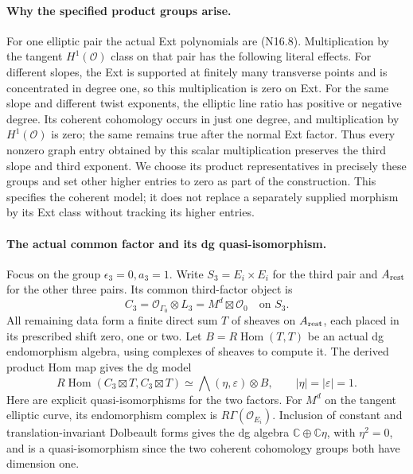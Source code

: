 \paragraph{Why the specified product groups arise.}
For one elliptic pair the actual Ext polynomials are (N16.8).
Multiplication by the tangent \(H^1(\mathcal O)\) class on that
pair has the following literal effects. For different slopes,
the Ext is supported at finitely many transverse points and is
concentrated in degree one, so this multiplication is zero on Ext.
For the same slope and different twist exponents, the elliptic
line ratio has positive or negative degree. Its coherent cohomology
occurs in just one degree, and multiplication by \(H^1(\mathcal O)\)
is zero; the same remains true after the normal Ext factor.
Thus every nonzero graph entry obtained by this scalar multiplication
preserves the third slope and third exponent. We choose its product
representatives in precisely these groups and set other higher
entries to zero as part of the construction. This specifies the
coherent model; it does not replace a separately supplied morphism
by its Ext class without tracking its higher entries.

\paragraph{The actual common factor and its dg quasi-isomorphism.}
Focus on the group \(\epsilon_3=0,a_3=1\). Write
\(S_3=E_i\times E_i\) for the third pair and \(A_{\rm rest}\)
for the other three pairs. Its common third-factor object is
\[
 C_3=\mathcal O_{\Gamma_0}\otimes L_3
       =M^d\boxtimes\mathcal O_0\quad\text{on }S_3.
\]
All remaining data form a finite direct sum \(T\) of sheaves on
\(A_{\rm rest}\), each placed in its prescribed shift zero, one
or two. Let \(B=R\operatorname{Hom}(T,T)\) be an actual dg
endomorphism algebra, using complexes of sheaves to compute it.
The derived product Hom map gives the dg model
\begin{equation}\label{eq:G24-product-model}
 R\operatorname{Hom}(C_3\boxtimes T,C_3\boxtimes T)
             \simeq\bigwedge(\eta,\varepsilon)\otimes B,
 \qquad |\eta|=|\varepsilon|=1.
\end{equation}
Here are explicit quasi-isomorphisms for the two factors. For
\(M^d\) on the tangent elliptic curve, its endomorphism complex
is \(R\Gamma(\mathcal O_{E_i})\). Inclusion of constant and
translation-invariant Dolbeault forms gives the dg algebra
\(\mathbb C\oplus\mathbb C\eta\), with \(\eta^2=0\),
and is a quasi-isomorphism since the two coherent cohomology
groups both have dimension one.


